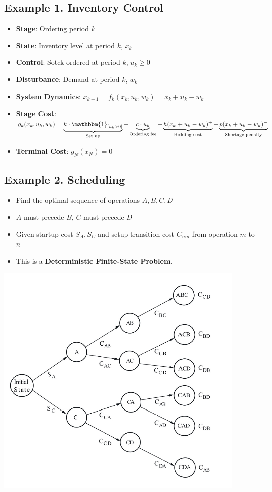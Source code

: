 \newpage
\subsection{Example 1. Inventory Control}
\begin{itemize}
    \item \textbf{Stage}: Ordering period $k$
    \item \textbf{State}: Inventory level at period $k$, $x_k$
    \item \textbf{Control}: Sotck ordered at period $k$, $u_k\geq 0$
    \item \textbf{Disturbance}: Demand at period $k$, $w_k$
    \item \textbf{System Dynamics}: $x_{k+1}=f_k(x_k,u_k,w_k)=x_k+u_k-w_k$
    \item \textbf{Stage Cost}: $g_k(x_k,u_k,w_k)= \underbrace{k\cdot \mathbbm{1}_{[u_k>0]}}_{\textbf{\rm Set up}} + \underbrace{c\cdot u_k}_{\textbf{\rm Ordering fee}} + \underbrace{h(x_k+u_k-w_k)^{+}}_{\textbf{\rm Holding cost}}  + \underbrace{p(x_k+u_k-w_k)^{-}}_{\textbf{\rm Shortage penalty}}$
    \item \textbf{Terminal Cost}: $g_N(x_N)=0$
\end{itemize}

\subsection{Example 2. Scheduling}
\begin{itemize}
    \item Find the optimal sequence of operations $A,B,C,D$
    \item $A$ must precede $B$, $C$ must precede $D$
    \item Given startup cost $S_A,S_C$ and setup transition cost $C_{nm}$ from operation $m$ to $n$
    \item This is a \textbf{Deterministic Finite-State Problem}.
\end{itemize}
\centerline{\includegraphics[width=12cm]{Lecture1/Fig2.png}}

